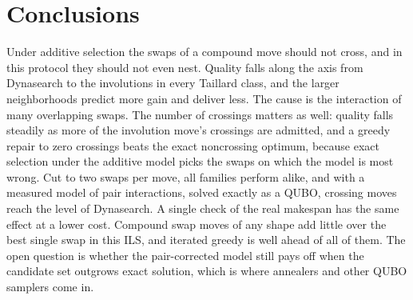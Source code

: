 \documentclass{article}
\begin{document}
\section{Conclusions}
Under additive selection the swaps of a compound move should not
cross, and in this protocol they should not even nest. Quality falls
along the axis from Dynasearch to the involutions in every Taillard
class, and the larger neighborhoods predict more gain and deliver less.
The cause is the interaction of many overlapping swaps. The number of
crossings matters as well: quality falls steadily as more of the
involution move's crossings are admitted, and a greedy repair to zero
crossings beats the exact noncrossing optimum, because exact selection
under the additive model picks the swaps on which the model is most
wrong. Cut to two
swaps per move, all families perform alike, and with a measured model of
pair interactions, solved exactly as a QUBO, crossing moves reach the
level of Dynasearch. A single check of the real makespan has the same
effect at a lower cost. Compound swap moves of any shape add little over
the best single swap in this ILS, and iterated greedy is well ahead of
all of them. The open question is whether the pair-corrected model still
pays off when the candidate set outgrows exact solution, which is where
annealers and other QUBO samplers come in.
\end{document}
